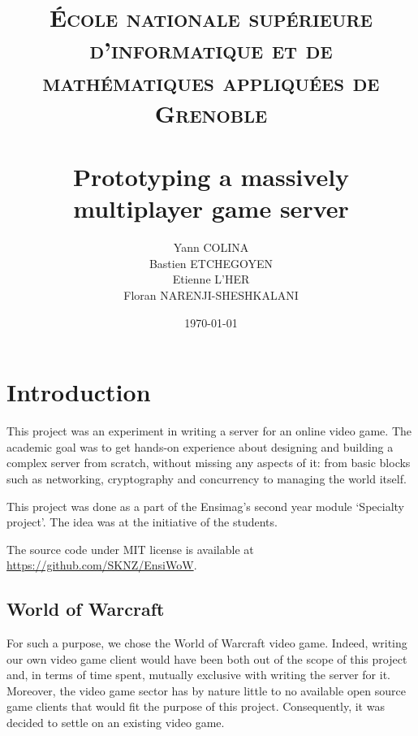 \documentclass[paper=a4, fontsize=11pt]{scrartcl}
\title{%
    \normalfont{}
    \normalsize{}
    \textsc{École nationale supérieure d'informatique et de mathématiques appliquées de Grenoble} \\ [10pt]
    \horrule{0.5pt} \\[0.4cm]
    \huge Prototyping a massively multiplayer game server
    \horrule{2pt} \\[0.5cm]
}
\author{Yann COLINA\\
Bastien ETCHEGOYEN\\
Etienne L'HER\\
Floran NARENJI-SHESHKALANI}
\date{\normalsize\today}
\begin{document}
\maketitle

\pagebreak
\tableofcontents
\pagebreak

\section{Introduction}

This project was an experiment in writing a server for an online
video game.
The academic goal was to get hands-on experience about designing and building a
complex server from scratch, without missing any aspects of it: from basic blocks
such as networking, cryptography and concurrency to managing the world itself.

This project was done as a part of the Ensimag's second year module `Specialty
project'.
The idea was at the initiative of the students.

The source code under MIT license is available at
\url{https://github.com/SKNZ/EnsiWoW}.

\subsection{World of Warcraft}

For such a purpose, we chose the World of Warcraft video game.
Indeed, writing our own video game client would have been both out of the scope
of this project and, in terms of time spent, mutually exclusive with writing the
server for it.
Moreover, the video game sector has by nature little to no available open source
game clients that would fit the purpose of this project.
Consequently, it was decided to settle on an existing video game.
\end{document}
